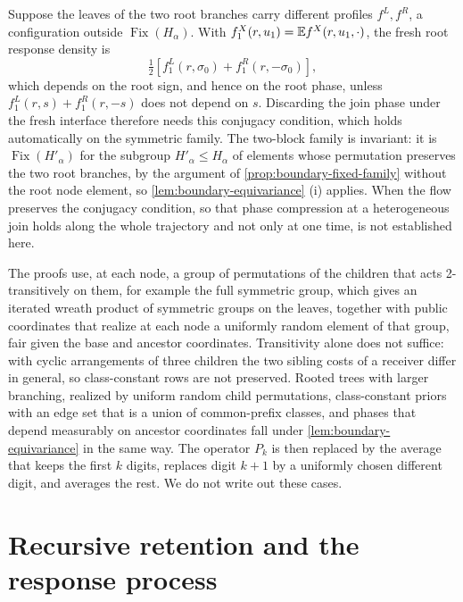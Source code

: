 Suppose the leaves of the two root branches carry different profiles $f^L,f^R$, a configuration outside $\operatorname{Fix}(H_\alpha)$. With $f_1^X(r,u_1)=\mathbb E f^X(r,u_1,\cdot)$, the fresh root response density is
\begin{equation}
 \tfrac12\left[f_1^L(r,\sigma_0)+f_1^R(r,-\sigma_0)\right],
 \label{eq:boundary-hetero-root}
\end{equation}
which depends on the root sign, and hence on the root phase, unless $f_1^L(r,s)+f_1^R(r,-s)$ does not depend on $s$. Discarding the join phase under the fresh interface therefore needs this conjugacy condition, which holds automatically on the symmetric family. The two-block family is invariant: it is $\operatorname{Fix}(H'_\alpha)$ for the subgroup $H'_\alpha\le H_\alpha$ of elements whose permutation preserves the two root branches, by the argument of \cref{prop:boundary-fixed-family} without the root node element, so \cref{lem:boundary-equivariance} (i) applies. When the flow preserves the conjugacy condition, so that phase compression at a heterogeneous join holds along the whole trajectory and not only at one time, is not established here.

The proofs use, at each node, a group of permutations of the children that acts 2-transitively on them, for example the full symmetric group, which gives an iterated wreath product of symmetric groups on the leaves, together with public coordinates that realize at each node a uniformly random element of that group, fair given the base and ancestor coordinates. Transitivity alone does not suffice: with cyclic arrangements of three children the two sibling costs of a receiver differ in general, so class-constant rows are not preserved. Rooted trees with larger branching, realized by uniform random child permutations, class-constant priors with an edge set that is a union of common-prefix classes, and phases that depend measurably on ancestor coordinates fall under \cref{lem:boundary-equivariance} in the same way. The operator $P_k$ is then replaced by the average that keeps the first $k$ digits, replaces digit $k+1$ by a uniformly chosen different digit, and averages the rest. We do not write out these cases.

\section{Recursive retention and the response process}
\label{sec:boundary-tree-inheritance}

